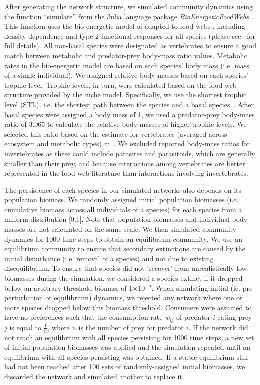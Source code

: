 \documentclass[12pt]{article}
\begin{document}
\begin{spacing}{2.0}
  
    		After generating the network structure, we simulated community dynamics using the function ``simulate'' from the Julia language package \emph{BioEnergeticFoodWebs}~\citep{bioenergeticfw,Delmas2017}. This function uses the bio-energetic model of \citet{Yodzis1992} adapted to food webs \citep{Williams2007}, including density dependence and type 2 functional responses for all species (please see~\citet{Delmas2017} for full details).
    		All non-basal species were designated as vertebrates to ensure a good match between metabolic and predator-prey body-mass ratio values. Metabolic rates in the bio-energetic model are based on each species' body mass (i.e. mass of a single individual). We assigned relative body masses based on each species' trophic level. Trophic levels, in turn, were calculated based on the food-web structure provided by the niche model. Specifically, we use the shortest trophic level (STL), i.e. the shortest path between the species and a basal species~\citep{Hairston1993}. After basal species were assigned a body mass of 1, we used a predator-prey body-mass ratio of 3.065 to calculate the relative body masses of higher trophic levels. We selected this ratio based on the estimate for vertebrates (averaged across ecosystem and metabolic types) in~\citet{Brose2006}. We excluded reported body-mass ratios for invertebrates as these could include parasites and parasitoids, which are generally smaller than their prey, and because interactions among vertebrates are better represented in the food-web literature than interactions involving invertebrates.
    		
    		
    		The persistence of each species in our simulated networks also depends on its population biomass. 
    		We randomly assigned initial population biomasses (i.e. cumulative biomass across all individuals of a species) for each species from a uniform distribution [0,1]. Note that population biomasses and individual body masses are not calculated on the same scale. We then simulated community dynamics for 1000 time steps to obtain an equilibrium community. We use an equilibrium community to ensure that secondary extinctions are caused by the initial disturbance (i.e. removal of a species) and not due to existing disequilibrium. To ensure that species did not `recover' from unrealistically low biomasses during the simulation, we considered a species extinct if it dropped below an arbitrary threshold biomass of 1$\times10^{-5}$. When simulating initial (ie. pre-perturbation or equilibrium) dynamics, we rejected any network where one or more species dropped below this biomass threshold. Consumers were assumed to have no preferences such that the consumption rate $w_{ij}$ of predator $i$ eating prey $j$ is equal to $\frac{1}{n}$, where $n$ is the number of prey for predator $i$. If the network did not reach an equilibrium with all species persisting for 1000 time steps, a new set of initial population biomasses was applied and the simulation repeated until an equilibrium with all species persisting was obtained.
    		If a stable equilibrium still had not been reached after 100 sets of randomly-assigned initial biomasses, we discarded the network and simulated another to replace it.
    

\end{spacing}
\end{document}
